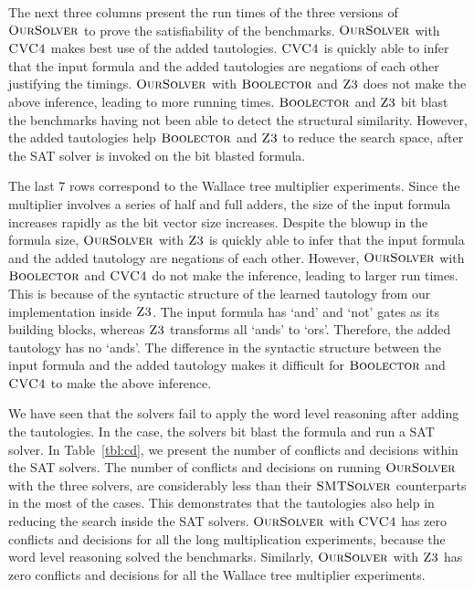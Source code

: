

The next three columns present the run times of the three versions of
$\textsc{OurSolver}$ to prove the satisfiability of the benchmarks.
%
$\textsc{OurSolver}$ with $\textsc{CVC4}$ makes best use of the added tautologies.
%
$\textsc{CVC4}$ is quickly able to infer that the input formula and the
added tautologies are negations of each other justifying the timings.
%
$\textsc{OurSolver}$ with $\textsc{Boolector}$ and $\textsc{Z3}$ does not make the above
inference, leading to more running times.
%
$\textsc{Boolector}$ and $\textsc{Z3}$ bit blast the benchmarks having not been
able to detect the structural similarity.
%
However, the added tautologies help $\textsc{Boolector}$ and $\textsc{Z3}$ to
reduce the search space, after the SAT solver is invoked on the bit
blasted formula.


The last 7 rows correspond to the Wallace tree multiplier experiments.
%
Since the multiplier involves a series of half and full adders, the
size of the input formula increases rapidly as the bit vector size
increases.
%
Despite the blowup in the formula size, $\textsc{OurSolver}$ with $\textsc{Z3}$ is
quickly able to infer that the input formula and the added tautology
are negations of each other.
%
However, $\textsc{OurSolver}$ with $\textsc{Boolector}$ and $\textsc{CVC4}$ do not make the
inference, leading to larger run times.
%
This is because of the syntactic structure of the learned tautology
from our implementation inside $\textsc{Z3}$.
%
The input formula has `and' and `not' gates as its building blocks,
whereas $\textsc{Z3}$ transforms all `ands' to `ors'.
%
Therefore, the added tautology has no `ands'.
%
The difference in the syntactic structure between the input formula
and the added tautology makes it difficult for $\textsc{Boolector}$ and
$\textsc{CVC4}$ to make the above inference.
%

We have seen that the solvers fail to apply the word level reasoning
after adding the tautologies.
%
In the case, the solvers bit blast the formula and run a SAT solver.
%
In Table~\ref{tbl:cd}, we present the number of conflicts and decisions within
the SAT solvers.
%
The number of conflicts and decisions on running $\textsc{OurSolver}$ with the
three solvers, are considerably less than their $\textsc{SMTSolver}$
counterparts in the most of the cases.
%
This demonstrates that the tautologies also help in reducing the
search inside the SAT solvers. 
%
$\textsc{OurSolver}$ with $\textsc{CVC4}$ has zero conflicts and
decisions for all the long multiplication experiments, because the 
word level reasoning solved the benchmarks.
%
Similarly, $\textsc{OurSolver}$ with $\textsc{Z3}$ has zero conflicts and decisions for all the
Wallace tree multiplier experiments.

